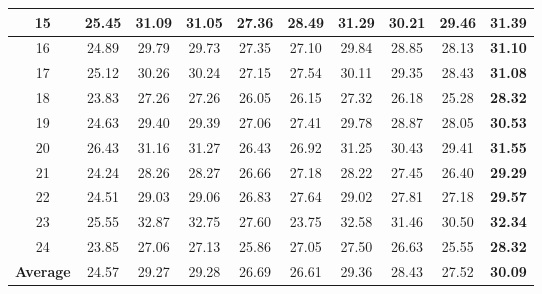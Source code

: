 \documentclass[10pt,onecolumn,letterpaper]{article}
\begin{document}
\begin{table}
\begin{center}
\begin{tabular}{|c||c|c|c|c|c|c|c|c|c|}
\hline
15 & 25.45 & 31.09 & 31.05 & 27.36 & 28.49 & 31.29 & 30.21 & 29.46 & \textbf{31.39}
\\
\hline
16 & 24.89 & 29.79 & 29.73 & 27.35 & 27.10 & 29.84 & 28.85 & 28.13 & \textbf{31.10}
\\
\hline
17 & 25.12 & 30.26 & 30.24 & 27.15 & 27.54 & 30.11 & 29.35 & 28.43 & \textbf{31.08}
\\
\hline
18 & 23.83 & 27.26 & 27.26 & 26.05 & 26.15 & 27.32 & 26.18 & 25.28 & \textbf{28.32}
\\
\hline
19 & 24.63 & 29.40 & 29.39 & 27.06 & 27.41 & 29.78 & 28.87 & 28.05 & \textbf{30.53}
\\
\hline
20 & 26.43 & 31.16 & 31.27 & 26.43 & 26.92 & 31.25 & 30.43 & 29.41 & \textbf{31.55}
\\
\hline
21 & 24.24 & 28.26 & 28.27 & 26.66 & 27.18 & 28.22 & 27.45 & 26.40 & \textbf{29.29}
\\
\hline
22 & 24.51 & 29.03 & 29.06 & 26.83 & 27.64 & 29.02 & 27.81 & 27.18 & \textbf{29.57}
\\
\hline
23 & 25.55 & 32.87 & 32.75 & 27.60 & 23.75 & 32.58 & 31.46 & 30.50 & \textbf{32.34}
\\
\hline
24 & 23.85 & 27.06 & 27.13 & 25.86 & 27.05 & 27.50 & 26.63 & 25.55 & \textbf{28.32}
\\
\hline
\textbf{Average} & 24.57 & 29.27 & 29.28 & 26.69 & 26.61 & 29.36 & 28.43 & 27.52 & \textbf{30.09}
\\
\hline
\end{tabular}
\end{center}
\vspace{-1mm}
\end{table}
\end{document}
